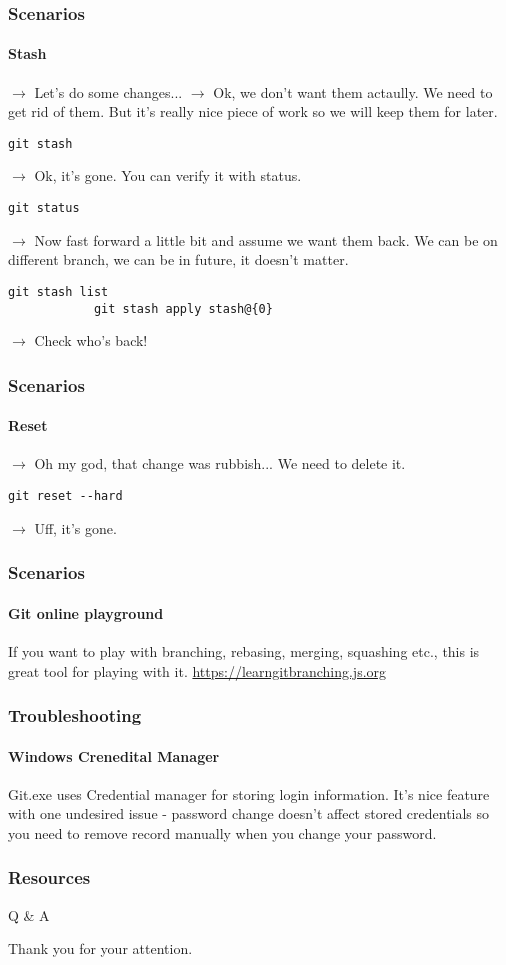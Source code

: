 \documentclass[aspectratio=169]{beamer}
\newcommand{\adjustimg}{%
  \checkoddpage%
  \ifoddpage\hspace*{\dimexpr\evensidemargin-\oddsidemargin}\else\hspace*{-\dimexpr\evensidemargin-\oddsidemargin}\fi%
}
\newcommand{\centerimg}[2][width=\textwidth]{%
  \makebox[\textwidth]{\adjustimg\texttt{[image: \#2]}}%
}
\begin{document}
    \begin{frame}[fragile]
        \frametitle{Scenarios}
        \framesubtitle{Stash}
        $\rightarrow$ Let's do some changes...\newline
        $\rightarrow$ Ok, we don't want them actaully. We need to get rid of them. But it's really nice piece of work so we will keep them for later.
        \begin{lstlisting}[gobble=12]
            git stash
        \end{lstlisting}
        $\rightarrow$ Ok, it's gone. You can verify it with status.
        \begin{lstlisting}[gobble=12]
            git status
        \end{lstlisting}
        $\rightarrow$ Now fast forward a little bit and assume we want them back. We can be on different branch, we can be in future, it doesn't matter. 
        \begin{lstlisting}[gobble=12]
            git stash list
            git stash apply stash@{0}
        \end{lstlisting}
        $\rightarrow$ Check who's back!
    \end{frame}
    \begin{frame}[fragile]
        \frametitle{Scenarios}
        \framesubtitle{Reset}
        $\rightarrow$ Oh my god, that change was rubbish... We need to delete it.
        \begin{lstlisting}[gobble=12]
            git reset --hard
        \end{lstlisting}
        $\rightarrow$ Uff, it's gone.
    \end{frame}
    \begin{frame}
        \frametitle{Scenarios}
        \framesubtitle{Git online playground}
        If you want to play with branching, rebasing, merging, squashing etc., this is great tool for playing with it.\newline
        \url{https://learngitbranching.js.org}
    \end{frame}
    \begin{frame}
        \frametitle{Troubleshooting}
        \framesubtitle{Windows Crenedital Manager}       
        Git.exe uses Credential manager for storing login information. It's nice feature with one undesired issue - password change doesn't affect stored credentials so you need to remove record manually when you change your password.
        \noindent\centerimg[width=0.6\paperwidth]{credentials.png} 
    \end{frame}

    \begin{frame}[fragile]
        \frametitle{Resources}
        \nocite{*}
        \printbibliography     
    \end{frame}
    \begin{frame}
        \Huge{Q \& A}
    \end{frame}
    \begin{frame}
        \Huge{Thank you for your attention.}
    \end{frame}
\end{document}
